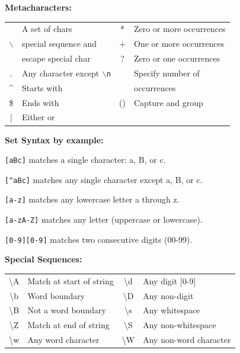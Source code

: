 \documentclass[5pt]{article}
\begin{document}
\begin{multicols}{2}
\textbf{Metacharacters:}\\
\begin{tabular}{C L|C L}
    \hline
    []                  & A set of chars                    & *     & Zero or more occurrences\\
    $\backslash$        & special sequence and              & +     & One or more occurrences\\
                        & escape special char               & ?     & Zero or one occurrences\\
    .                   & Any character except \texttt{$\backslash$n}  & {}    & Specify number of\\
    \textasciicircum    & Starts with                      &       & occurrences\\
    \$                  & Ends with                        & ()    & Capture and group\\
    |                   & Either or\\
    \hline
\end{tabular}

\textbf{Set Syntax by example:}\\
\begin{itemize*}
    \item \texttt{[aBc]} matches a single character: a, B, or c.
    \item \texttt{[\textasciicircum aBc]} matches any single character except a, B, or c.
    \item \texttt{[a-z]} matches any lowercase letter a through z.
    \item \texttt{[a-zA-Z]} matches any letter (uppercase or lowercase).
    \item \texttt{[0-9][0-9]} matches two consecutive digits (00-99).
\end{itemize*}

\textbf{Special Sequences:}\\
\begin{tabular}{C L|C L}
    \hline
    \textbackslash A & Match at start of string & \textbackslash d & Any digit [0-9]\\
    \textbackslash b & Word boundary            & \textbackslash D & Any non-digit\\
    \textbackslash B & Not a word boundary      & \textbackslash s & Any whitespace\\
    \textbackslash Z & Match at end of string   & \textbackslash S & Any non-whitespace\\
    \textbackslash w & Any word character       & \textbackslash W & Any non-word character\\
    \hline
\end{tabular}


\end{multicols}
\end{document}
